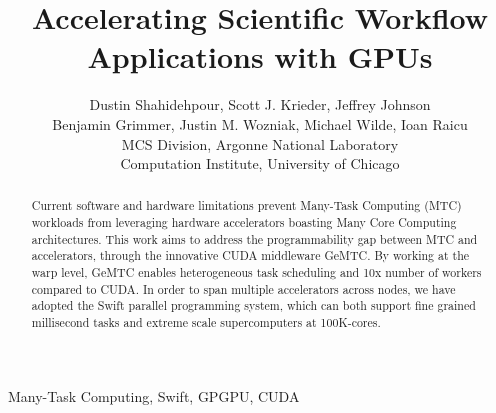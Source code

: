 \documentclass[conference]{IEEEtran}
\begin{document}
%
\title{Accelerating Scientific Workflow Applications with GPUs}


\author{Dustin Shahidehpour,
Scott J. Krieder,
Jeffrey Johnson\\
Benjamin Grimmer,
Justin M. Wozniak,
Michael Wilde,
Ioan Raicu\\
MCS Division, Argonne National Laboratory\\
Computation Institute, University of Chicago
}


\maketitle


\begin{abstract}
Current software and hardware limitations prevent Many-Task Computing (MTC) workloads from leveraging hardware accelerators boasting Many Core Computing architectures. This work aims to address the programmability gap between MTC and accelerators, through the innovative CUDA middleware GeMTC. By working at the warp level, GeMTC enables heterogeneous task scheduling and 10x number of workers compared to CUDA. In order to span multiple accelerators across nodes, we have adopted the Swift parallel programming system, which can both support fine grained millisecond tasks and extreme scale supercomputers at 100K-cores.
\end{abstract}

\begin{IEEEkeywords}
Many-Task Computing, Swift, GPGPU, CUDA
\end{IEEEkeywords}

\IEEEpeerreviewmaketitle
\end{document}
